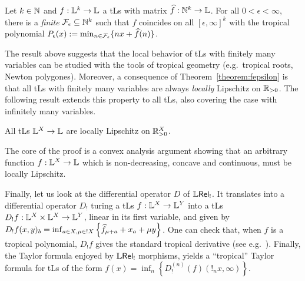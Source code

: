 \documentclass[submission,%
]{eptcs}
\begin{document}
\begin{theorem}\label{theorem:fepsilon}
 Let $k\in\mathbb{N}$ and $f:\mathbb{L}^k\to\mathbb{L}$ a tLs with matrix $\widehat{f}:\mathbb{N}^k\to\mathbb{L}$.
 For all $0<\epsilon<\infty$, there is a \emph{finite} $\mathcal{F}_\epsilon \subseteq \mathbb{N}^k$ such that 
% 
$f$ coincides on all $[\epsilon,\infty]^k$ with the tropical {polynomial} $P_\epsilon(x):=\min_{n\in \mathcal{F}_\epsilon}\{nx+\widehat{f}(n)\}$.
\end{theorem}
The result above suggests that the local behavior of tLs with finitely many variables can be studied with the tools of tropical geometry (e.g.~tropical roots, Newton polygones). %
Moreover, a consequence of Theorem~\ref{theorem:fepsilon} is that all tLs with {finitely many} variables are always \emph{locally} Lipschitz on $\mathbb{R}_{>0}$.
The following result extends this property to all tLs, also covering the case with infinitely many variables.





\begin{theorem}\label{thmTLSlocLip}
 All tLs $\mathbb{L}^X\to\mathbb{L}$ are locally Lipschitz on $\mathbb{R}_{>0}^X$.
\end{theorem}
The core of the proof is a convex analysis argument showing that an arbitrary function $f:\mathbb{L}^X\to\mathbb{L}$ which is non-decreasing, concave and continuous, must be locally Lipschitz. 

Finally, let us look at the differential operator $D$ of $\mathbb{L} \mathsf{Rel}_{!}$.
It translates into a differential operator $D_{!}$ turing a tLs $f:\mathbb{L}^{X}\to \mathbb{L}^{Y}$ into a tLs $D_{!}f:\mathbb{L}^{X}\times \mathbb{L}^{X}\to \mathbb{L}^{Y}$, linear in its first variable, and given by $D_{!}f(x,y)_{b}=\inf_{a\in X, \mu\in !X}\left\{\widehat{f}_{\mu+a}+x_{a}+\mu y\right\}$.
One can check that, when $f$ is a tropical polynomial, $D_{!}f$ gives the standard tropical derivative (see e.g.~\cite{Grigoriev2017}).
Finally, the Taylor formula enjoyed by $\mathbb{L} \mathsf{Rel}_!$ morphisms, yields a ``tropical'' Taylor formula for tLs of the form $f(x)=\inf_{n}\left\{D_{!}^{(n)}(f)(!_{n}x,\infty)\right\}$.
\end{document}
